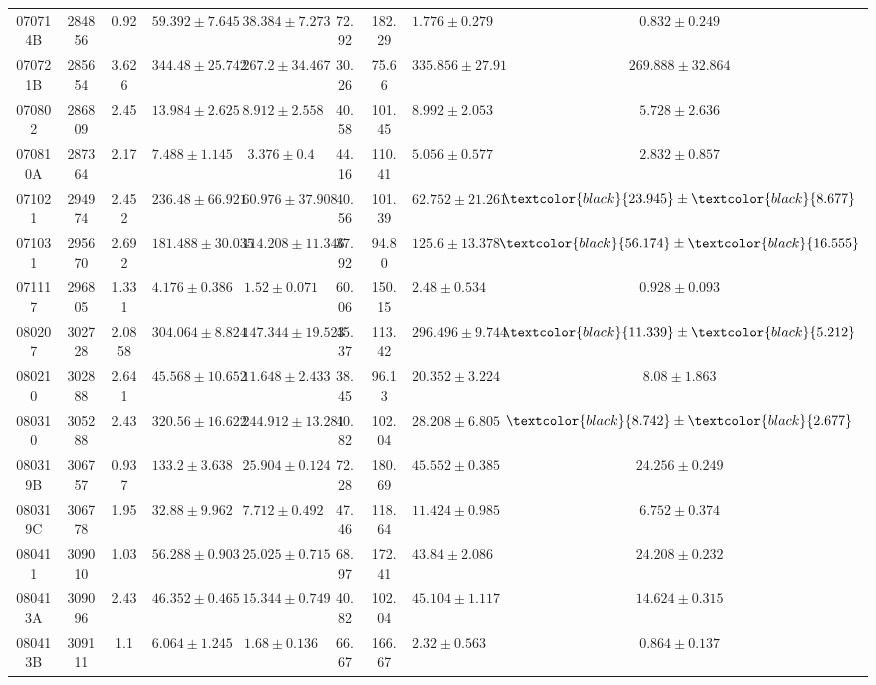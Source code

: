 \documentclass[prd,nofootinbib,preprintnumbers,floatfix]{revtex4}  %
\newcommand{\rthis}[1]{\textcolor{black}{#1}}
\begin{document}
\begin{center}
\begin{longtable*}{|c|c|c|c|c|c|c|c|c|}
070714B	&	284856	&	0.92	&	$	59.392	\pm	7.645	$	&	$	38.384	\pm	7.273	$	&	72.92	&	182.29	&	$	1.776	\pm	0.279	$	&	$	0.832	\pm	0.249	$	\\
070721B	&	285654	&	3.626	&	$	344.48	\pm	25.742	$	&	$	267.2	\pm	34.467	$	&	30.26	&	75.66	&	$	335.856	\pm	27.91	$	&	$	269.888	\pm	32.864	$	\\
070802	&	286809	&	2.45	&	$	13.984	\pm	2.625	$	&	$	8.912	\pm	2.558	$	&	40.58	&	101.45	&	$	8.992	\pm	2.053	$	&	$	5.728	\pm	2.636	$	\\
070810A	&	287364	&	2.17	&	$	7.488	\pm	1.145	$	&	$	3.376	\pm	0.4	$	&	44.16	&	110.41	&	$	5.056	\pm	0.577	$	&	$	2.832	\pm	0.857	$	\\
071021	&	294974	&	2.452	&	$	236.48	\pm	66.921	$	&	$	60.976	\pm	37.908	$	&	40.56	&	101.39	&	$	62.752	\pm	21.261	$	&	$	\rthis{23.945}	\pm	\rthis{8.677}	$	\\
071031	&	295670	&	2.692	&	$	181.488	\pm	30.035	$	&	$	114.208	\pm	11.346	$	&	37.92	&	94.80	&	$	125.6	\pm	13.378	$	&	$	\rthis{56.174}	\pm	\rthis{16.555}	$	\\
071117	&	296805	&	1.331	&	$	4.176	\pm	0.386	$	&	$	1.52	\pm	0.071	$	&	60.06	&	150.15	&	$	2.48	\pm	0.534	$	&	$	0.928	\pm	0.093	$	\\
080207	&	302728	&	2.0858	&	$	304.064	\pm	8.824	$	&	$	147.344	\pm	19.523	$	&	45.37	&	113.42	&	$	296.496	\pm	9.744	$	&	$	\rthis{11.339}	\pm	\rthis{5.212}	$	\\
080210	&	302888	&	2.641	&	$	45.568	\pm	10.652	$	&	$	11.648	\pm	2.433	$	&	38.45	&	96.13	&	$	20.352	\pm	3.224	$	&	$	8.08	\pm	1.863	$	\\
080310	&	305288	&	2.43	&	$	320.56	\pm	16.622	$	&	$	244.912	\pm	13.281	$	&	40.82	&	102.04	&	$	28.208	\pm	6.805	$	&	$	\rthis{8.742}	\pm	\rthis{2.677}	$	\\
080319B	&	306757	&	0.937	&	$	133.2	\pm	3.638	$	&	$	25.904	\pm	0.124	$	&	72.28	&	180.69	&	$	45.552	\pm	0.385	$	&	$	24.256	\pm	0.249	$	\\
080319C	&	306778	&	1.95	&	$	32.88	\pm	9.962	$	&	$	7.712	\pm	0.492	$	&	47.46	&	118.64	&	$	11.424	\pm	0.985	$	&	$	6.752	\pm	0.374	$	\\
080411	&	309010	&	1.03	&	$	56.288	\pm	0.903	$	&	$	25.025	\pm	0.715	$	&	68.97	&	172.41	&	$	43.84	\pm	2.086	$	&	$	24.208	\pm	0.232	$	\\
080413A	&	309096	&	2.43	&	$	46.352	\pm	0.465	$	&	$	15.344	\pm	0.749	$	&	40.82	&	102.04	&	$	45.104	\pm	1.117	$	&	$	14.624	\pm	0.315	$	\\
080413B	&	309111	&	1.1	&	$	6.064	\pm	1.245	$	&	$	1.68	\pm	0.136	$	&	66.67	&	166.67	&	$	2.32	\pm	0.563	$	&	$	0.864	\pm	0.137	$	\\

\end{longtable*}
\end{center}
\end{document}
